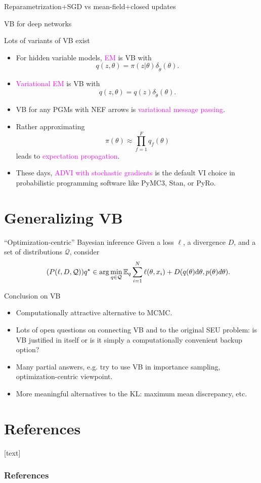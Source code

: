\documentclass[10pt]{beamer}
\newcommand\un[1]{\textcolor{magenta}{#1}}
\def\blank{\vspace{.5\textheight}}
\begin{document}
\begin{frame}{Reparametrization+SGD vs mean-field+closed updates}
  \vfill
  \blank
\end{frame}

\begin{frame}{VB for deep networks}
  \vfill
  \blank
\end{frame}

\begin{frame}{Lots of variants of VB exist \citep{Mur12}}
  \begin{itemize}
    \item For hidden variable models, \un{EM} is VB with $$q(z,\theta) = \pi(z\vert \theta)\delta_{\tilde\theta}(\theta).$$
    \item \un{Variational EM} is VB with $$q(z,\theta) = q(z)\delta_{\tilde\theta}(\theta).$$
    \item VB for any PGMs with NEF arrows is \un{variational message passing}.
    \item Rather approximating $$\pi(\theta) \approx \prod_{f=1}^F q_f(\theta)$$ leads to \un{expectation propagation}.
    \item These days, \un{ADVI with stochastic gradients} is the default VI choice in probabilistic programming software like PyMC3, Stan, or PyRo.
  \end{itemize}
\end{frame}

\section{Generalizing VB}
\begin{frame}{``Optimization-centric'' Bayesian inference}
  Given a loss $\ell$, a divergence $D$, and a set of distributions $\mathcal{Q}$, consider\begin{equation}
  \label{e:GVI}
  \tag{$P(\ell, D, \mathcal{Q})$}
  q^\star \in \arg\min_{q\in \mathcal{Q}} \mathbb{E}_q \sum_{i=1}^N \ell(\theta, x_i) + D(q(\theta)\d\theta, p(\theta)d\theta).
\end{equation}
\blank
\end{frame}

\begin{frame}{Conclusion on VB}
  \begin{itemize}
    \item Computationally attractive alternative to MCMC.
    \item Lots of open questions on connecting VB and to the original SEU problem: is VB justified in itself or is it simply a computationally convenient backup option?
    \item Many partial answers, e.g. try to use VB in importance sampling, optimization-centric viewpoint.
    \item More meaningful alternatives to the KL: maximum mean discrepancy, etc.
  \end{itemize}
\end{frame}



\section*{References}
[text]%
\begin{frame}[allowframebreaks]
\frametitle{References}
\small
\printbibliography
\normalsize
\end{frame}
\end{document}
